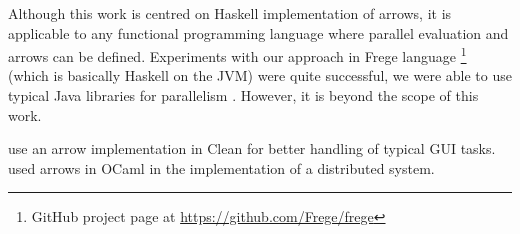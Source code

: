 Although this work is centred on Haskell implementation of arrows, it is applicable to any functional programming language where parallel evaluation and arrows can be defined. Experiments with our approach in Frege language \footnote{GitHub project page at \url{https://github.com/Frege/frege}} (which is basically Haskell on the JVM) were quite successful, we were able to use typical Java libraries for parallelism . However, it is beyond the scope of this work.

\citet{achten2004arrows,achten2007arrow} use an arrow implementation in Clean for better handling of typical GUI tasks. \citet{Dagand:2009:ORD:1481861.1481870} used arrows in OCaml in the implementation of a distributed system.


